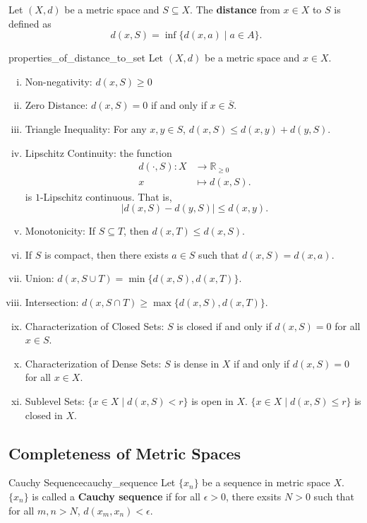 \documentclass{report}
\begin{document}
\begin{definition}{}{}
	Let $(X,d)$ be a metric space and $S\subseteq X$. The \textbf{distance} from $x\in X$ to $S$ is defined as
	\[
	d(x,S) = \inf\{d(x,a)\mid a\in A\}.
	\]
\end{definition}
\begin{proposition}{}{properties_of_distance_to_set}
	Let $(X,d)$ be a metric space and $x\in X$.
	\begin{enumerate}[(i)]
		\item Non-negativity: $d(x, S) \ge 0$
		\item Zero Distance: $d(x,S)=0$ if and only if $x\in\overline{S}$.
		\item Triangle Inequality: For any $x,y \in S$, $d(x, S) \le d(x, y) + d(y, S)$.
		\item Lipschitz Continuity: the function
		\begin{align*}
			d(\cdot,S):X &\longrightarrow \mathbb{R}_{\ge 0} \\
			x &\longmapsto d(x,S).
		\end{align*}
		is $1$-Lipschitz continuous. That is, 
		\[
		 \left| d(x, S) - d(y, S) \right| \le d(x, y).
		\]
		\item Monotonicity: If $S \subseteq T$, then $d(x, T) \le d(x, S)$.
		\item If $S$ is compact, then there exists $a\in S$ such that $d(x,S)=d(x,a)$.
		\item Union: $d(x, S \cup T) = \min\{d(x, S), d(x, T)\}$.
		\item Intersection: $d(x, S \cap T) \geq \max\{d(x, S), d(x, T)\}$.
		\item Characterization of Closed Sets: $S$ is closed if and only if $d(x, S) = 0$ for all $x \in S$.
		\item Characterization of Dense Sets: $S$ is dense in $X$ if and only if $d(x, S) = 0$ for all $x \in X$.
		\item Sublevel Sets: $\{x \in X \mid d(x, S) < r\}$ is open in $X$. $\{x \in X \mid d(x, S) \le r\}$ is closed in $X$.
	\end{enumerate}
\end{proposition}


\subsection{Completeness of Metric Spaces}
\begin{definition}{Cauchy Sequence}{cauchy_sequence}
	Let $\{x_n\}$ be a sequence in metric space $X$. $\{x_n\}$ is called a \textbf{Cauchy sequence} if for all $\epsilon>0$, there exsits $N>0$ such that for all $m,n>N$, $d(x_m,x_n)<\epsilon$.
\end{definition}
\end{document}
